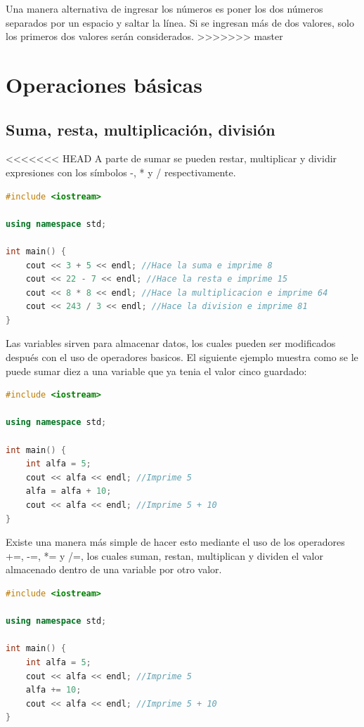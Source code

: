 \documentclass{article}
\begin{document}
Una manera alternativa de ingresar los números es poner los dos números separados por un espacio y saltar la línea. Si se ingresan más de dos valores, solo los primeros dos valores serán considerados.
>>>>>>> master

\section{Operaciones básicas}

\subsection{Suma, resta, multiplicación, división}

<<<<<<< HEAD
A parte de sumar se pueden restar, multiplicar y dividir expresiones con los símbolos -, * y / respectivamente.

\begin{lstlisting}[language=C++, title=Operaciones basicas]
#include <iostream>

using namespace std;

int main() {
	cout << 3 + 5 << endl; //Hace la suma e imprime 8
	cout << 22 - 7 << endl; //Hace la resta e imprime 15
	cout << 8 * 8 << endl; //Hace la multiplicacion e imprime 64
	cout << 243 / 3 << endl; //Hace la division e imprime 81
}
\end{lstlisting}

Las variables sirven para almacenar datos, los cuales pueden ser modificados después con el uso de operadores basicos. El siguiente ejemplo muestra como se le puede sumar diez a una variable que ya tenia el valor cinco guardado:

\begin{lstlisting}[language=C++, title=Operaciones basicas]
#include <iostream>

using namespace std;

int main() {
	int alfa = 5;
	cout << alfa << endl; //Imprime 5
	alfa = alfa + 10;
	cout << alfa << endl; //Imprime 5 + 10
}
\end{lstlisting}

Existe una manera más simple de hacer esto mediante el uso de los operadores +=, -=, *= y /=, los cuales suman, restan, multiplican y dividen el valor almacenado dentro de una variable por otro valor.

\begin{lstlisting}[language=C++, title=Operaciones basicas]
#include <iostream>

using namespace std;

int main() {
	int alfa = 5;
	cout << alfa << endl; //Imprime 5
	alfa += 10;
	cout << alfa << endl; //Imprime 5 + 10
}
\end{lstlisting}
\end{document}
